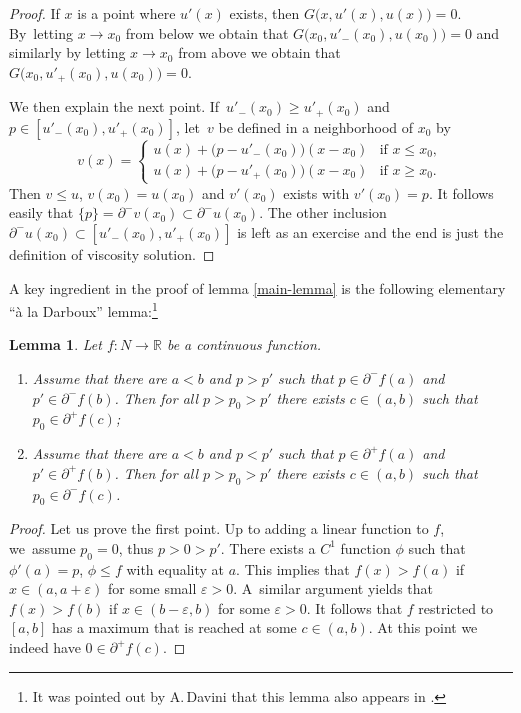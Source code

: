 \documentclass[JEP,XML,SOM,Unicode,NoFloatCountersInSection,published]{cedram}
\newtheorem{lem}[thm]{Lemma}
\theoremstyle{definition}
\newcommand{\R}{\mathbb{R}}
\begin{document}
\begin{appendix}
\begin{proof}
If $x$ is a point where $u'(x)$ exists, then $G\bigl(x,u'(x),u(x)\bigr)=0$. By~letting $x\to x_0$ from below we obtain that $ G(x_0,u'_-(x_0),u(x_0)\bigr)=0$ and similarly by letting $x\to x_0$ from above we obtain that $ G(x_0,u'_+(x_0),u(x_0)\bigr)=0$.

We then explain the next point. If~$ u'_-(x_0)\geqslant u'_+(x_0)$ and $p\in [ u'_-(x_0) , u'_+(x_0)]$, let~$v$ be defined in a neighborhood of $x_0$ by
\[
v(x) =
\begin{cases}
u(x) + \bigl(p- u'_-(x_0)\bigr)(x-x_0) &\text{if } x\leqslant x_0,\\
u(x) + \bigl(p- u'_+(x_0)\bigr)(x-x_0) &\text{if } x\geqslant x_0.
\end{cases}
\]
Then $v\leqslant u$, $v(x_0) = u(x_0)$ and $v'(x_0)$ exists with $v'(x_0) =p$. It follows easily that $\{p\} = \partial^- v(x_0) \subset \partial^- u(x_0)$. The other inclusion $\partial^-u(x_0) \subset [ u'_-(x_0) , u'_+(x_0)]$ is left as an exercise and the end is just the definition of viscosity solution.
\end{proof}

A key ingredient in the proof of lemma \ref{main-lemma} is the following elementary ``à la Darboux'' lemma:\footnote{It was pointed out by A.\,Davini that this lemma also appears in \cite{Tran}.}

\begin{lem}\label{dif}
Let $f : N \to \R$ be a continuous function.
\begin{enumerate}
\item Assume that there are $a<b$ and $p>p'$ such that $p\in \partial^- f(a)$ and $p'\in \partial^- f(b)$. Then for all $p>p_0>p'$ there exists $c\in (a,b)$ such that $p_0\in \partial^+ f(c)$;
\item Assume that there are $a<b$ and $p<p'$ such that $p\in \partial^+ f(a)$ and $p'\in \partial^+ f(b)$. Then for all $p>p_0>p'$ there exists $c\in (a,b)$ such that $p_0\in \partial^- f(c)$.
\end{enumerate}

\end{lem}
\begin{proof}
Let us prove the first point. Up to adding a linear function to $f$, we~assume $p_0=0$, thus $p>0>p'$. There exists a $C^1$ function $\phi$ such that $\phi'(a) = p$, $\phi\leqslant f$ with equality at $a$. This implies that $f(x)> f(a)$ if $x\in (a,a+\varepsilon)$ for some small $\varepsilon>0$. A~similar argument yields that $f(x)> f(b)$ if $x\in (b-\varepsilon,b)$ for some $\varepsilon>0$. It follows that $f$ restricted to $[a,b]$ has a maximum that is reached at some $c\in(a,b)$. At this point we indeed have $0\in \partial^+ f(c)$.
\end{proof}


\end{appendix}
\end{document}
